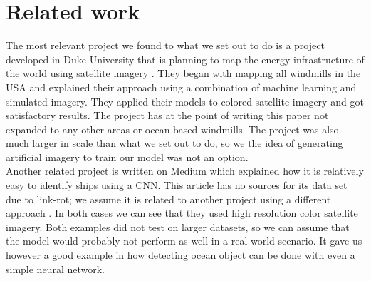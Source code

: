 \section{Related work}
%

The most relevant project we found to what we set out to do is a project developed in Duke University that is planning to map the energy infrastructure of the world using satellite imagery \cite{duke}. They began with mapping all windmills in the USA and explained their approach \cite{duke_github} using a combination of machine learning and simulated imagery. They applied their models to colored satellite imagery and got satisfactory results. The project has at the point of writing this paper not expanded to any other areas or ocean based windmills. The project was also much larger in scale than what we set out to do, so we the idea of generating artificial imagery to train our model was not an option.\\

Another related project is written on Medium \cite{moraite_2019} which explained how it is relatively easy to identify ships using a CNN. This article has no sources for its data set due to link-rot; we assume it is related to another project using a different approach \cite{sagar_2019}. In both cases we can see that they used high resolution color satellite imagery. Both examples did not test on larger datasets, so we can assume that the model would probably not perform as well in a real world scenario. It gave us however a good example in how detecting ocean object can be done with even a simple neural network.\\
